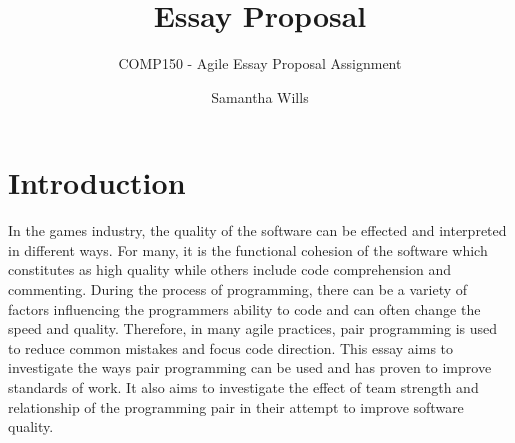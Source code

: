 \documentclass{scrartcl}
\title{Essay Proposal}
\subtitle{COMP150 - Agile Essay Proposal Assignment}
\author{Samantha Wills}
\begin{document}
\maketitle

\section*{Introduction}
In the games industry, the quality of the software can be effected and interpreted in different ways. For many, it is the functional cohesion of the software which constitutes as high quality while others include code comprehension and commenting. During the process of programming, there can be a variety of factors influencing the programmers ability to code and can often change the speed and quality. Therefore, in many agile practices, pair programming is used to reduce common mistakes and focus code direction. This essay aims to investigate the ways pair programming can be used and has proven to improve standards of work. It also aims to investigate the effect of team strength and relationship of the programming pair in their attempt to improve software quality.
\end{document}
